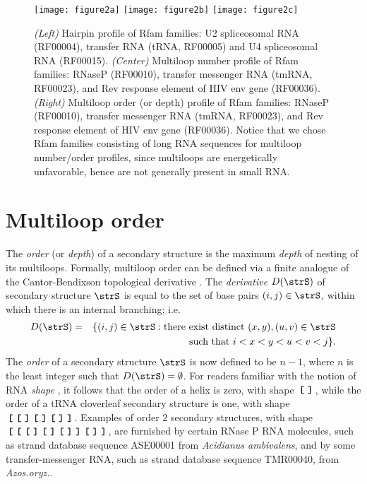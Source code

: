 \begin{figure}[tbhp]
\centering
\texttt{[image: figure2a]}
\texttt{[image: figure2b]}
\texttt{[image: figure2c]}
\caption{{\em (Left)}
Hairpin profile of Rfam families:
U2 spliceosomal RNA (RF00004),
transfer RNA (tRNA, RF00005) and
U4 spliceosomal RNA (RF00015).
{\em (Center)}
Multiloop number profile of
Rfam families: RNaseP (RF00010), transfer messenger RNA (tmRNA, RF00023),
and Rev response element of HIV env gene (RF00036).
{\em (Right)}
Multiloop order (or depth) profile of
Rfam families: RNaseP (RF00010), transfer messenger RNA (tmRNA, RF00023),
and Rev response element of HIV env gene (RF00036).
Notice that we chose Rfam families consisting of long RNA sequences
for multiloop number/order profiles, since multiloops are energetically
unfavorable, hence are not generally present in small RNA.
}
\label{fig:RfamProfiles}
\end{figure}

\section{Multiloop order}
\label{section:multiloopOrderPartitionFunction}


The {\em order} (or {\em depth}) of a secondary structure is
the maximum {\em depth} of nesting of its multiloops.
Formally, multiloop order
can be defined via a finite analogue of the Cantor-Bendixson topological
derivative \cite{clote:CantorBendixson,kechris}.
The {\em derivative} $D(\strS)$ of secondary
structure $\strS$ is equal to the set of base pairs $(i,j) \in \strS$,
within which there is an internal branching; i.e.
\begin{eqnarray*}
D(\strS) &=& \{ (i,j) \in \strS : \mbox{there exist distinct
$(x,y),(u,v) \in \strS$} \\
&&\mbox{such that $i<x<y<u<v<j$} \}.
\end{eqnarray*}
The {\em order} of a secondary structure $\strS$ is now
defined to be $n-1$, where $n$ is the least integer such that
$D(\strS)=\emptyset$. For readers familiar with the notion of
RNA {\em shape} \cite{giegerich:shapesNAR},
it follows that the order of a helix is
zero, with shape $\,\mbox{\bf\texttt{[}}\, \,\mbox{\bf\texttt{]}}\,$, while the order of a tRNA cloverleaf secondary
structure is one, with shape $\,\mbox{\bf\texttt{[}}\, \,\mbox{\bf\texttt{[}}\, \,\mbox{\bf\texttt{]}}\, \,\mbox{\bf\texttt{[}}\, \,\mbox{\bf\texttt{]}}\, \,\mbox{\bf\texttt{[}}\, \,\mbox{\bf\texttt{]}}\, \,\mbox{\bf\texttt{]}}\,$.
Examples of order $2$ secondary structures, with shape
$\,\mbox{\bf\texttt{[}}\, \,\mbox{\bf\texttt{[}}\, \,\mbox{\bf\texttt{[}}\, \,\mbox{\bf\texttt{]}}\, \,\mbox{\bf\texttt{[}}\, \,\mbox{\bf\texttt{]}}\, \,\mbox{\bf\texttt{[}}\, \,\mbox{\bf\texttt{]}}\, \,\mbox{\bf\texttt{]}}\, \,\mbox{\bf\texttt{[}}\, \,\mbox{\bf\texttt{]}}\, \,\mbox{\bf\texttt{]}}\,$, are furnished by
certain RNase P RNA molecules, such as
{\sc strand} database \cite{Andronescu.bb08} sequence
ASE00001 from {\em Acidianus ambivalens}, and by some transfer-messenger
RNA, such as {\sc strand} database sequence
TMR00040, from {\em Azos.oryz.}.


